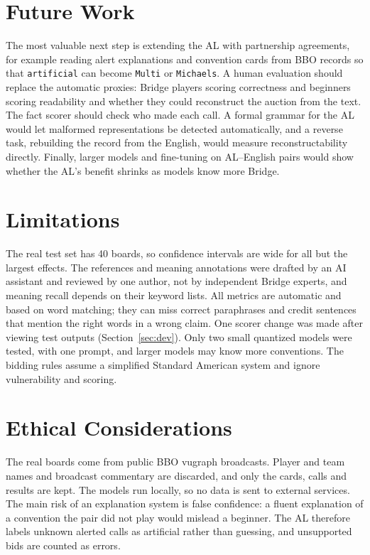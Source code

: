 \documentclass[11pt]{article}
\begin{document}
\section{Future Work}

The most valuable next step is extending the AL with partnership agreements, for example reading alert explanations and convention cards from BBO records so that \texttt{artificial} can become \texttt{Multi} or \texttt{Michaels}. A human evaluation should replace the automatic proxies: Bridge players scoring correctness and beginners scoring readability and whether they could reconstruct the auction from the text. The fact scorer should check who made each call. A formal grammar for the AL would let malformed representations be detected automatically, and a reverse task, rebuilding the record from the English, would measure reconstructability directly. Finally, larger models and fine-tuning on AL--English pairs would show whether the AL's benefit shrinks as models know more Bridge.

\section*{Limitations}

The real test set has 40 boards, so confidence intervals are wide for all but the largest effects. The references and meaning annotations were drafted by an AI assistant and reviewed by one author, not by independent Bridge experts, and meaning recall depends on their keyword lists. All metrics are automatic and based on word matching; they can miss correct paraphrases and credit sentences that mention the right words in a wrong claim. One scorer change was made after viewing test outputs (Section~\ref{sec:dev}). Only two small quantized models were tested, with one prompt, and larger models may know more conventions. The bidding rules assume a simplified Standard American system and ignore vulnerability and scoring.

\section*{Ethical Considerations}

The real boards come from public BBO vugraph broadcasts. Player and team names and broadcast commentary are discarded, and only the cards, calls and results are kept. The models run locally, so no data is sent to external services. The main risk of an explanation system is false confidence: a fluent explanation of a convention the pair did not play would mislead a beginner. The AL therefore labels unknown alerted calls as artificial rather than guessing, and unsupported bids are counted as errors.
\end{document}
